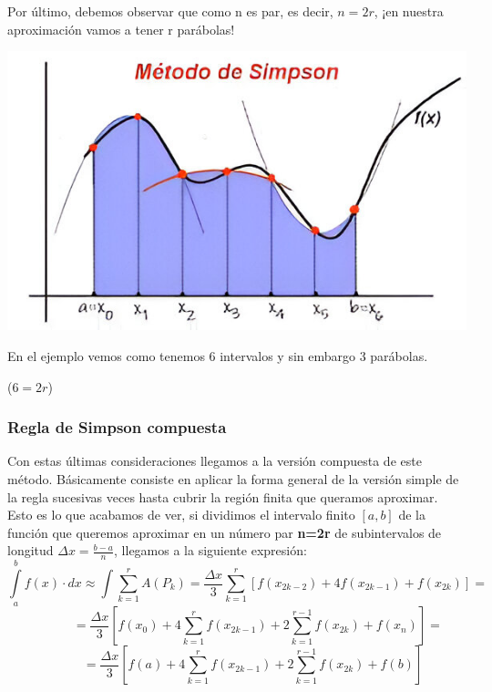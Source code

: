 \documentclass{article}
\begin{document}
		Por último, debemos observar que como n es par, es decir, $n=2r$, ¡en nuestra aproximación vamos a tener r parábolas!\\
		
		\begin{center}
			\includegraphics[scale=0.45]{rpara}
		\end{center}
		
		En el ejemplo vemos como tenemos 6 intervalos y sin embargo 3 parábolas. \begin{center}($6=2r$)\end{center}
		
		\subsubsection{Regla de Simpson compuesta}
		
			Con estas últimas consideraciones llegamos a la versión compuesta de este método. Básicamente consiste en aplicar la forma general de la versión simple de la regla sucesivas veces hasta cubrir la región finita que queramos aproximar.\\
			
			Esto es lo que acabamos de ver, si dividimos el intervalo finito $[a,b]$ de la función que queremos aproximar en un número par \textbf{n=2r} de subintervalos de longitud $\Delta x=\frac{b-a}{n}$, llegamos a la siguiente expresión:
			\begin{equation*}
				\int \limits_{a}^{b} f(x) \cdot dx \approx 
				\int \sum_{k=1}^{r}A(P_k) =
				\frac{\Delta x}{3}\sum_{k=1}^{r}[f(x_{2k-2})+4f(x_{2k-1})+f(x_{2k})] =
			\end{equation*}
			\begin{equation*}
				\;\;\;\;\;\;\;\;\;\;\;\;
				=\frac{\Delta x}{3}[f(x_0)+4\sum_{k=1}^{r}f(x_{2k-1})+2\sum_{k=1}^{r-1}f(x_{2k})+f(x_n)] =
			\end{equation*}
			\begin{equation}
				\;\;\;\;\;\;\;\;\;
				=\frac{\Delta x}{3}[f(a)+4\sum_{k=1}^{r}f(x_{2k-1})+2\sum_{k=1}^{r-1}f(x_{2k})+f(b)]
			\end{equation}
			
\end{document}
